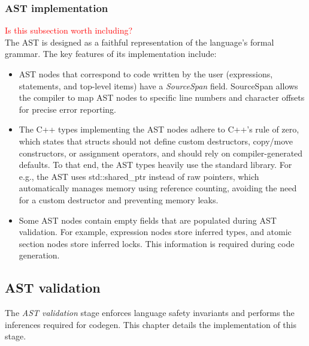 \documentclass[a4paper,12pt,fleqn]{article}
\begin{document}
\subsubsection{AST implementation}
\textcolor{red}{Is this subsection worth including?}\\
The AST is designed as a faithful representation of the language's formal grammar. The key features of its implementation include:
\begin{itemize}
  \item AST nodes that correspond to code written by the user (expressions, statements, and top-level items) have a \textit{SourceSpan} field. SourceSpan allows the compiler to map AST nodes to specific line numbers and character offsets for precise error reporting.
  \item The C++ types implementing the AST nodes adhere to C++'s rule of zero, which states that structs should not define custom destructors, copy/move constructors, or assignment operators, and should rely on compiler-generated defaults. To that end, the AST types heavily use the standard library. For e.g., the AST uses std::shared\_ptr instead of raw pointers, which automatically manages memory using reference counting, avoiding the need for a custom destructor and preventing memory leaks.
  \item Some AST nodes contain empty fields that are populated during AST validation. For example, expression nodes store inferred types, and atomic section nodes store inferred locks. This information is required during code generation.
\end{itemize}
\subsection{AST validation} \label{sec:ast-validation}
The \textit{AST validation} stage enforces language safety invariants and performs the inferences required for codegen. This chapter details the implementation of this stage.
\end{document}

